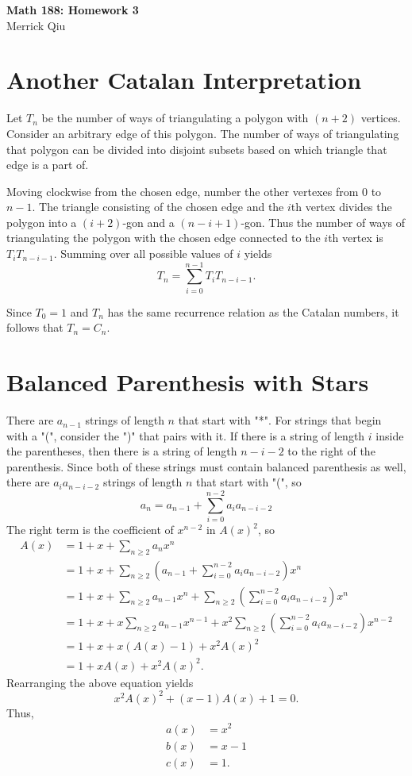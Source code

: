 \documentclass{article}
\begin{document}
\begin{center}
	\huge{\bf Math 188: Homework 3} \\
	Merrick Qiu
\end{center}

\section{Another Catalan Interpretation}
   Let $T_n$ be the number of ways of triangulating 
   a polygon with $(n+2)$ vertices.
   Consider an arbitrary edge of this polygon.
   The number of ways of triangulating that polygon
   can be divided into disjoint subsets based on which triangle
   that edge is a part of. 

   Moving clockwise from the chosen edge, 
   number the other vertexes from $0$ to $n-1$.
   The triangle consisting of the chosen edge and the $i$th vertex 
   divides the polygon into a $(i+2)$-gon and a $(n-i+1)$-gon.
   Thus the number of ways of triangulating the polygon 
   with the chosen edge connected to the $i$th vertex
   is $T_iT_{n-i-1}$. Summing over all possible values of $i$ yields
   \[
      T_n = \sum_{i=0}^{n-1} T_i T_{n-i-1}.
   \]

   Since $T_0 = 1$ and $T_n$ has 
   the same recurrence relation as the Catalan numbers,
   it follows that $T_n = C_n$.
\newpage

\section{Balanced Parenthesis with Stars}
   There are $a_{n-1}$ strings of length $n$ that start with "*".
   For strings that begin with a "(", consider the ")" that pairs with it.
   If there is a string of length $i$ inside the parentheses,
   then there is a string of length $n-i-2$ to the right of the parenthesis.
   Since both of these strings must contain balanced parenthesis as well,
   there are $a_ia_{n-i-2}$ strings of length $n$ that start with "(", so
   \[
      a_n = a_{n-1} + \sum_{i=0}^{n-2} a_ia_{n-i-2}
   \]
   The right term is the coefficient of $x^{n-2}$ in $A(x)^2$, so 
   \begin{align*}
      A(x) &= 1 + x + \sum_{n \geq 2} a_n x^n \\
           &= 1 + x + \sum_{n \geq 2} 
            \left( a_{n-1} + \sum_{i=0}^{n-2} a_ia_{n-i-2}\right) x^n \\
           &= 1 + x + \sum_{n \geq 2} a_{n-1}x^n + 
            \sum_{n \geq 2}\left(\sum_{i=0}^{n-2} a_ia_{n-i-2}\right) x^n \\
           &= 1 + x + x\sum_{n \geq 2} a_{n-1}x^{n-1} + 
            x^2\sum_{n \geq 2}\left(\sum_{i=0}^{n-2} a_ia_{n-i-2}\right) x^{n-2} \\
           &= 1+ x + x(A(x)-1) + x^2 A(x)^2 \\
           &= 1 + xA(x) + x^2 A(x)^2.
   \end{align*}
   Rearranging the above equation yields 
   \[
      x^2A(x)^2 + (x-1)A(x) + 1 = 0.
   \]
   Thus, 
   \begin{align*}
      a(x) &= x^2 \\
      b(x) &= x-1 \\
      c(x) &= 1.
   \end{align*}
\newpage
\end{document}
